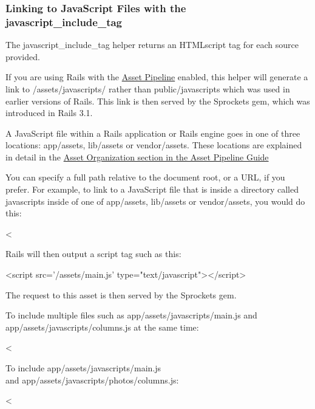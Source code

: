\documentclass[10pt]{book}
\newenvironment{code}{%
  \scriptsize
    \verbatim
}{%
    \endverbatim
    \newline
}
\begin{document}
\subsubsection{ Linking to JavaScript Files with the \\ javascript\_include\_tag}

The javascript\_include\_tag helper returns an HTMLscript tag for each source provided.

If you are using Rails with the \href{http://guides.rubyonrails.org/asset_pipeline.html}{Asset Pipeline} enabled, this helper will generate a link to /assets/javascripts/ rather than public/javascripts which was used in earlier versions of Rails. This link is then served by the Sprockets gem, which was introduced in Rails 3.1.

A JavaScript file within a Rails application or Rails engine goes in one of three locations: app/assets, lib/assets or vendor/assets. These locations are explained in detail in the \href{http://guides.rubyonrails.org/asset_pipeline.html#asset-organization}{Asset Organization section in the Asset Pipeline Guide}

You can specify a full path relative to the document root, or a URL, if you prefer. For example, to link to a JavaScript file that is inside a directory called javascripts inside of one of app/assets, lib/assets or vendor/assets, you would do this:
\begin{code}
<%
\end{code}

Rails will then output a script tag such as this:
\begin{code}
<script src='/assets/main.js' type="text/javascript"></script>
\end{code}

The request to this asset is then served by the Sprockets gem.

To include multiple files such as app/assets/javascripts/main.js and app/assets/javascripts/columns.js at the same time:
\begin{code}
<%
\end{code}

To include app/assets/javascripts/main.js \\ and app/assets/javascripts/photos/columns.js:
\begin{code}
<%
\end{code}
\end{document}
